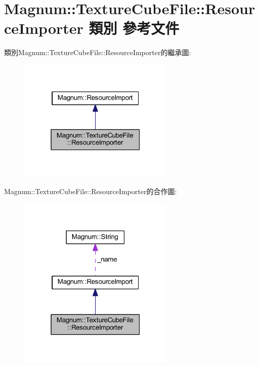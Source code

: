 \hypertarget{class_magnum_1_1_texture_cube_file_1_1_resource_importer}{}\section{Magnum\+:\+:Texture\+Cube\+File\+:\+:Resource\+Importer 類別 參考文件}
\label{class_magnum_1_1_texture_cube_file_1_1_resource_importer}


類別\+Magnum\+:\+:Texture\+Cube\+File\+:\+:Resource\+Importer的繼承圖\+:\nopagebreak
\begin{figure}[H]
\begin{center}
\leavevmode
\includegraphics[width=211pt]{class_magnum_1_1_texture_cube_file_1_1_resource_importer__inherit__graph}
\end{center}
\end{figure}


Magnum\+:\+:Texture\+Cube\+File\+:\+:Resource\+Importer的合作圖\+:\nopagebreak
\begin{figure}[H]
\begin{center}
\leavevmode
\includegraphics[width=211pt]{class_magnum_1_1_texture_cube_file_1_1_resource_importer__coll__graph}
\end{center}
\end{figure}
